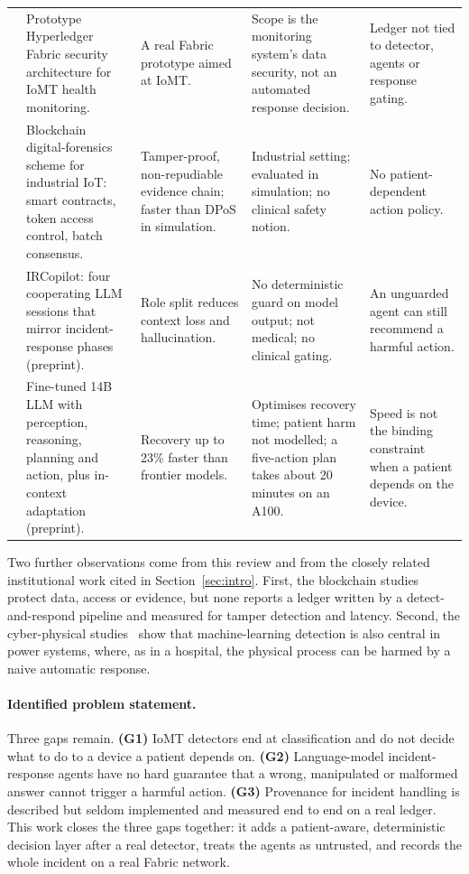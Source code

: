 \documentclass[preprint,12pt]{elsarticle}
\begin{document}
\begin{table}[htbp]
\begin{tabular}{@{}C{0.8cm}L{2.9cm}L{3.0cm}L{3.1cm}L{2.9cm}@{}}
\cite{pelekoudas2023} & Prototype Hyperledger Fabric security architecture for IoMT health monitoring. & A real Fabric prototype aimed at IoMT. & Scope is the monitoring system's data security, not an automated response decision. & Ledger not tied to detector, agents or response gating. \\
\cite{xiao2024} & Blockchain digital-forensics scheme for industrial IoT: smart contracts, token access control, batch consensus. & Tamper-proof, non-repudiable evidence chain; faster than DPoS in simulation. & Industrial setting; evaluated in simulation; no clinical safety notion. & No patient-dependent action policy. \\
\cite{lin2025} & IRCopilot: four cooperating LLM sessions that mirror incident-response phases (preprint). & Role split reduces context loss and hallucination. & No deterministic guard on model output; not medical; no clinical gating. & An unguarded agent can still recommend a harmful action. \\
\cite{gao2026} & Fine-tuned 14B LLM with perception, reasoning, planning and action, plus in-context adaptation (preprint). & Recovery up to 23\% faster than frontier models. & Optimises recovery time; patient harm not modelled; a five-action plan takes about 20 minutes on an A100. & Speed is not the binding constraint when a patient depends on the device. \\
\bottomrule
\end{tabular}
\end{table}

Two further observations come from this review and from the closely related institutional work cited in Section~\ref{sec:intro}. First, the blockchain studies~\cite{vidhya2023,mukhopadhyay2021,hasnain2023,pelekoudas2023,xiao2024} protect data, access or evidence, but none reports a ledger written by a detect-and-respond pipeline and measured for tamper detection and latency. Second, the cyber-physical studies~\cite{pranav2026,vignes2025} show that machine-learning detection is also central in power systems, where, as in a hospital, the physical process can be harmed by a naive automatic response.

\paragraph{Identified problem statement.}
Three gaps remain. \textbf{(G1)} IoMT detectors end at classification and do not decide what to do to a device a patient depends on. \textbf{(G2)} Language-model incident-response agents have no hard guarantee that a wrong, manipulated or malformed answer cannot trigger a harmful action. \textbf{(G3)} Provenance for incident handling is described but seldom implemented and measured end to end on a real ledger. This work closes the three gaps together: it adds a patient-aware, deterministic decision layer after a real detector, treats the agents as untrusted, and records the whole incident on a real Fabric network.
\end{document}

